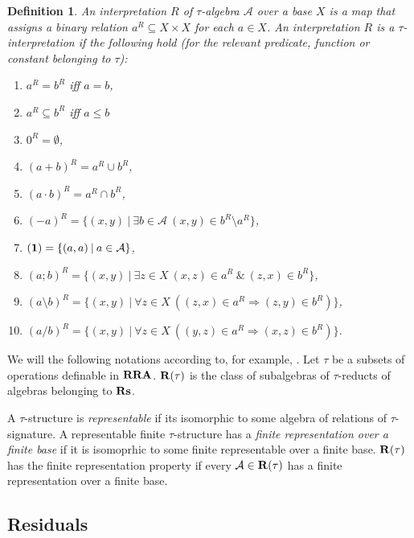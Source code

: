 \documentclass[a4paper]{article}
\theoremstyle{defin}
\newtheorem{defin}{Definition}
\theoremstyle{theorem}
\theoremstyle{prop}
\theoremstyle{lemma}
\theoremstyle{ex}
\theoremstyle{col}
\theoremstyle{claim}
\begin{document}
\begin{defin}
  An interpretation $R$ of $\tau$-algebra $\mathcal{A}$ over a base $X$ is a map that assigns a binary relation $a^R \subseteq X \times X$
  for each $a \in X$. An interpretation $R$ is a $\tau$-interpretation if the following hold
  (for the relevant predicate, function or constant belonging to $\tau$):
  \begin{enumerate}
    \item $a^R = b^R$ iff $a = b$,
    \item $a^R \subseteq b^R$ iff $a \leq b$
    \item $0^{R} = \emptyset$,
    \item $(a + b)^{R} = a^R \cup b^R$,
    \item $(a \cdot b)^{R} = a^R \cap b^R$,
    \item $(- a)^R = \{ (x, y) \: | \: \exists b \in \mathcal{A} \: (x, y) \in b^R \setminus a^R \}$,
    \item $({\bf 1}) = \{ (a, a) \: | \: a \in \mathcal{A} \}$,
    \item $(a;b)^R = \{ (x, y) \: | \: \exists z \in X \: (x, z) \in a^R \: \& \: (z, x) \in b^R \}$,
    \item $(a \setminus b)^{R} = \{ (x, y) \: | \: \forall z \in X \: ((z, x) \in a^R \Rightarrow (z, y) \in b^R)\}$,
    \item $(a / b)^{R} = \{ (x, y) \: | \: \forall z \in X \: ((y, z) \in a^R \Rightarrow (x, z) \in b^R)\}$.
  \end{enumerate}
\end{defin}

We will the following notations according to, for example, \cite{hirsch2011positive}. Let $\tau$ be a subsets of operations definable in ${\bf RRA}$. ${\bf R}(\tau)$ is the class of subalgebras of $\tau$-reducts of algebras belonging to ${\bf Rs}$.

A $\tau$-structure is \emph{representable} if its isomorphic to some algebra of relations of $\tau$-signature. A representable finite $\tau$-structure has a \emph{finite representation over a finite base} if it is isomoprhic to some finite representable over a finite base. ${\bf R}(\tau)$ has the finite representation property if every $\mathcal{A} \in {\bf R}(\tau)$ has a finite representation over a
finite base.

\subsection{Residuals}
\end{document}
